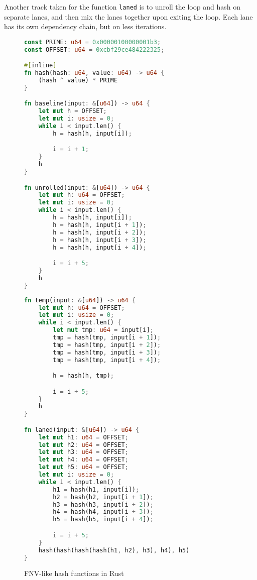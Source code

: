 \documentclass[10pt]{article}
\begin{document}
Another track taken for the function \texttt{laned} is to unroll the loop and hash on separate lanes,
and then mix the lanes together upon exiting the loop. Each lane has its own dependency chain, but on less iterations.

\begin{figure}[ht]
\begin{multicols}{2}
\begin{lstlisting}[language=Rust, style=boxed]
const PRIME: u64 = 0x00000100000001b3;
const OFFSET: u64 = 0xcbf29ce484222325;

#[inline]
fn hash(hash: u64, value: u64) -> u64 {
    (hash ^ value) * PRIME
}

fn baseline(input: &[u64]) -> u64 {
    let mut h = OFFSET;
    let mut i: usize = 0;
    while i < input.len() {
        h = hash(h, input[i]);

        i = i + 1;
    }
    h
}

fn unrolled(input: &[u64]) -> u64 {
    let mut h: u64 = OFFSET;
    let mut i: usize = 0;
    while i < input.len() {
        h = hash(h, input[i]);
        h = hash(h, input[i + 1]);
        h = hash(h, input[i + 2]);
        h = hash(h, input[i + 3]);
        h = hash(h, input[i + 4]);

        i = i + 5;
    }
    h
}
\end{lstlisting}
\columnbreak
\begin{lstlisting}[language=Rust, style=boxed]
fn temp(input: &[u64]) -> u64 {
    let mut h: u64 = OFFSET;
    let mut i: usize = 0;
    while i < input.len() {
        let mut tmp: u64 = input[i];
        tmp = hash(tmp, input[i + 1]);
        tmp = hash(tmp, input[i + 2]);
        tmp = hash(tmp, input[i + 3]);
        tmp = hash(tmp, input[i + 4]);

        h = hash(h, tmp);

        i = i + 5;
    }
    h
}

fn laned(input: &[u64]) -> u64 {
    let mut h1: u64 = OFFSET;
    let mut h2: u64 = OFFSET;
    let mut h3: u64 = OFFSET;
    let mut h4: u64 = OFFSET;
    let mut h5: u64 = OFFSET; 
    let mut i: usize = 0;
    while i < input.len() {
        h1 = hash(h1, input[i]);
        h2 = hash(h2, input[i + 1]);
        h3 = hash(h3, input[i + 2]);
        h4 = hash(h4, input[i + 3]);
        h5 = hash(h5, input[i + 4]);

        i = i + 5;
    }
    hash(hash(hash(hash(h1, h2), h3), h4), h5)
}
\end{lstlisting}
\end{multicols}
\caption{FNV-like hash functions in Rust}
\label{fig:ilp_rust_example}
\end{figure}
\end{document}
